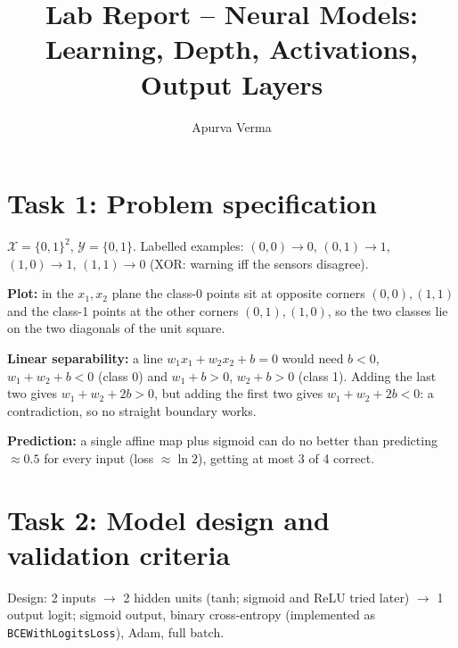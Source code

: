 \documentclass[10pt,a4paper]{article}
\title{Lab Report -- Neural Models: Learning, Depth, Activations, Output Layers}
\author{Apurva Verma}
\date{}
\begin{document}
\maketitle

\section*{Task 1: Problem specification}
$\mathcal X=\{0,1\}^2$, $\mathcal Y=\{0,1\}$. Labelled examples: $(0,0)\!\to\!0$, $(0,1)\!\to\!1$, $(1,0)\!\to\!1$, $(1,1)\!\to\!0$ (XOR: warning iff the sensors disagree).

\textbf{Plot:} in the $x_1,x_2$ plane the class-0 points sit at opposite corners $(0,0),(1,1)$ and the class-1 points at the other corners $(0,1),(1,0)$, so the two classes lie on the two diagonals of the unit square.


\begin{center}\end{center}
\textbf{Linear separability:} a line $w_1x_1+w_2x_2+b=0$ would need $b<0$, $w_1+w_2+b<0$ (class 0) and $w_1+b>0$, $w_2+b>0$ (class 1). Adding the last two gives $w_1+w_2+2b>0$, but adding the first two gives $w_1+w_2+2b<0$: a contradiction, so no straight boundary works.

\textbf{Prediction:} a single affine map plus sigmoid can do no better than predicting $\approx0.5$ for every input (loss $\approx\ln2$), getting at most 3 of 4 correct.

\section*{Task 2: Model design and validation criteria}
Design: 2 inputs $\to$ 2 hidden units (tanh; sigmoid and ReLU tried later) $\to$ 1 output logit; sigmoid output, binary cross-entropy (implemented as \texttt{BCEWithLogitsLoss}), Adam, full batch.
\end{document}
